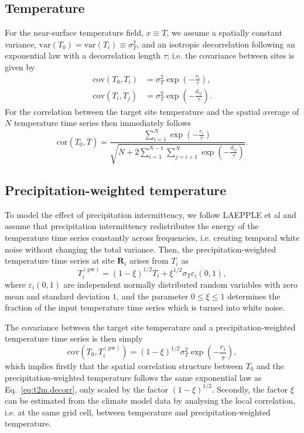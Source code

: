 \documentclass[cp, manuscript]{copernicus}
\begin{document}
\subsection{Temperature}
\label{app:concept.model.t2m}

For the near-surface temperature field, $x \equiv T$, we assume a spatially
constant variance, $\mathrm{var}(T_0)=\mathrm{var}(T_i)\equiv\sigma_T^2$, and an
isotropic decorrelation following an exponential law with a decorrelation length
$\tau$; i.e. the covariance between sites is given by
%
\begin{align}
\label{eq:t2m.decorr}
\mathrm{cov}(T_0,T_i)&=\sigma_T^2\exp{\left(-\frac{r_i}{\tau}\right)},\\
\mathrm{cov}(T_i,T_j)&=\sigma_T^2\exp{\left(-\frac{d_{ij}}{\tau}\right)}.
\end{align}
%
For the correlation between the target site temperature and the spatial average
of $N$ temperature time series then immediately follows
%
\begin{equation}
\label{eq:t2m.corr}
\mathrm{cor}(T_0,\overline{T})=
\frac{\sum_{i=1}^{N}\exp{\left(-\frac{r_i}{\tau}\right)}}
{\sqrt{N+2\sum_{i=1}^{N-1}
\sum_{j=i+1}^{N}{\exp{\left(-\frac{d_{ij}}{\tau}\right)}}}}.
\end{equation}

\subsection{Precipitation-weighted temperature}
\label{app:concept.model.t2m.pw}

To model the effect of precipitation intermittency, we follow LAEPPLE et al and
assume that precipitation intermittency redistributes the energy of the
temperature time series constantly across frequencies, i.e. creating temporal
white noise without changing the total variance. Then, the
precipitation-weighted temperature time series at site $\mathbf{R}_i$ arises
from $T_i$ as
%
\begin{equation}
\label{eq:precip.weighting}
T_i^{\mathrm{(pw)}}=
\left(1-\xi\right)^{1/2}T_i + \xi^{1/2} \sigma_T \varepsilon_i(0,1),
\end{equation}
%
where $\varepsilon_i(0,1)$ are independent normally distributed random variables
with zero mean and standard deviation $1$, and the parameter $0\leq\xi\leq1$
determines the fraction of the input temperature time series which is turned
into white noise.

The covariance between the target site temperature and a precipitation-weighted
temperature time series is then simply
\begin{equation}
\label{eq:t2m.pw.decorr}
\mathrm{cov}(T_0,T_i^{\mathrm{(pw)}})=
(1-\xi)^{1/2}\sigma_T^2\exp{\left(-\frac{r_i}{\tau}\right)},
\end{equation}
%
which implies firstly that the spatial correlation structure between $T_0$ and
the precipitation-weighted temperature follows the same exponential law as
Eq.~\eqref{eq:t2m.decorr}, only scaled by the factor $(1-\xi)^{1/2}$. Secondly,
the factor $\xi$ can be estimated from the climate model data by analysing the
local correlation, i.e. at the same grid cell, between temperature and
precipitation-weighted temperature.
\end{document}
